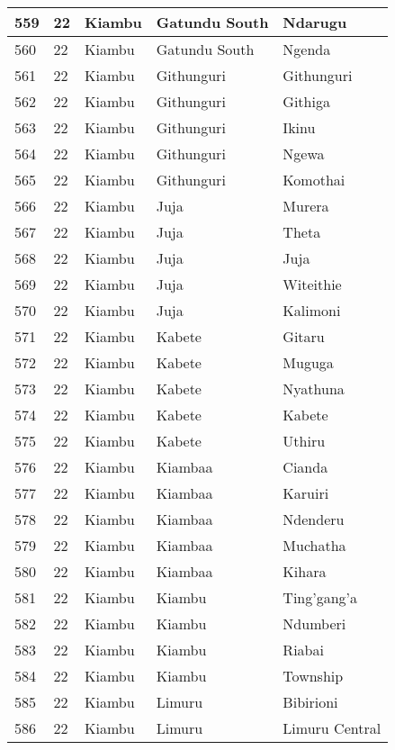 \begin{table}[!ht]
\begin{tabular}{|l|l|l|l|l|}
        559 & 22 & Kiambu & Gatundu South & Ndarugu \\ \hline
        560 & 22 & Kiambu & Gatundu South & Ngenda \\ \hline
        561 & 22 & Kiambu & Githunguri & Githunguri \\ \hline
        562 & 22 & Kiambu & Githunguri & Githiga \\ \hline
        563 & 22 & Kiambu & Githunguri & Ikinu \\ \hline
        564 & 22 & Kiambu & Githunguri & Ngewa \\ \hline
        565 & 22 & Kiambu & Githunguri & Komothai \\ \hline
        566 & 22 & Kiambu & Juja & Murera \\ \hline
        567 & 22 & Kiambu & Juja & Theta \\ \hline
        568 & 22 & Kiambu & Juja & Juja \\ \hline
        569 & 22 & Kiambu & Juja & Witeithie \\ \hline
        570 & 22 & Kiambu & Juja & Kalimoni \\ \hline
        571 & 22 & Kiambu & Kabete & Gitaru \\ \hline
        572 & 22 & Kiambu & Kabete & Muguga \\ \hline
        573 & 22 & Kiambu & Kabete & Nyathuna \\ \hline
        574 & 22 & Kiambu & Kabete & Kabete \\ \hline
        575 & 22 & Kiambu & Kabete & Uthiru \\ \hline
        576 & 22 & Kiambu & Kiambaa & Cianda \\ \hline
        577 & 22 & Kiambu & Kiambaa & Karuiri \\ \hline
        578 & 22 & Kiambu & Kiambaa & Ndenderu \\ \hline
        579 & 22 & Kiambu & Kiambaa & Muchatha \\ \hline
        580 & 22 & Kiambu & Kiambaa & Kihara \\ \hline
        581 & 22 & Kiambu & Kiambu & Ting’gang’a \\ \hline
        582 & 22 & Kiambu & Kiambu & Ndumberi \\ \hline
        583 & 22 & Kiambu & Kiambu & Riabai \\ \hline
        584 & 22 & Kiambu & Kiambu & Township \\ \hline
        585 & 22 & Kiambu & Limuru & Bibirioni \\ \hline
        586 & 22 & Kiambu & Limuru & Limuru Central \\ \hline

\end{tabular}
\end{table}
